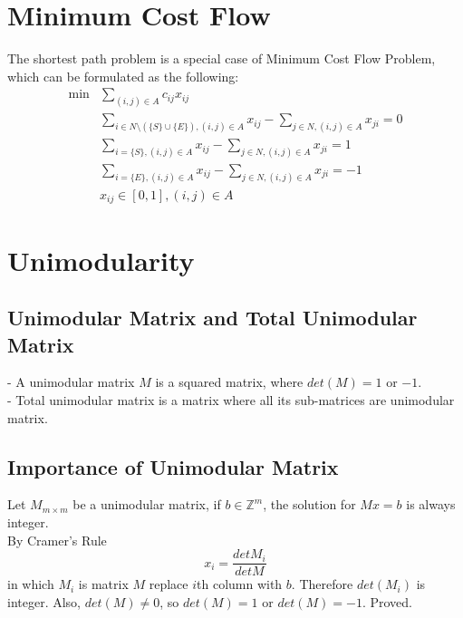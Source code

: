 		\section{Minimum Cost Flow}
			The shortest path problem is a special case of Minimum Cost Flow Problem, which can be formulated as the following:\\
			\begin{align}
				\min &\sum_{(i, j)\in A} c_{ij}x_{ij} \\
				& \sum_{i \in N\setminus(\{S\}\cup\{E\}), (i,j)\in A} x_{ij} - \sum_{j \in N, (i,j)\in A} x_{ji} = 0 \\
				& \sum_{i=\{S\}, (i,j)\in A} x_{ij} - \sum_{j \in N, (i,j)\in A} x_{ji} = 1 \\
				& \sum_{i=\{E\}, (i,j)\in A} x_{ij} - \sum_{j \in N, (i,j)\in A} x_{ji} = -1 \\
				& x_{ij} \in [0,1], (i,j)\in A 
			\end{align}				
		
		\section{Unimodularity}
			\subsection{Unimodular Matrix and Total Unimodular Matrix}
				- A unimodular matrix $M$ is a squared matrix, where $det(M)=1$ or $-1$.\\
				- Total unimodular matrix is a matrix where all its sub-matrices are unimodular matrix.

			\subsection{Importance of Unimodular Matrix}
				Let $M_{m\times m}$ be a unimodular matrix, if $b\in \mathbb{Z}^m$, the solution for $Mx=b$ is always integer.\\
				 By Cramer's Rule
				\begin{equation}
					x_i = \frac{det{M_i}}{det{M}} 
				\end{equation}
				in which $M_i$ is matrix $M$ replace $i$th column with $b$. Therefore $det(M_i)$ is integer. Also, $det(M)\ne 0$, so $det(M)=1$ or $det(M)=-1$. Proved.

